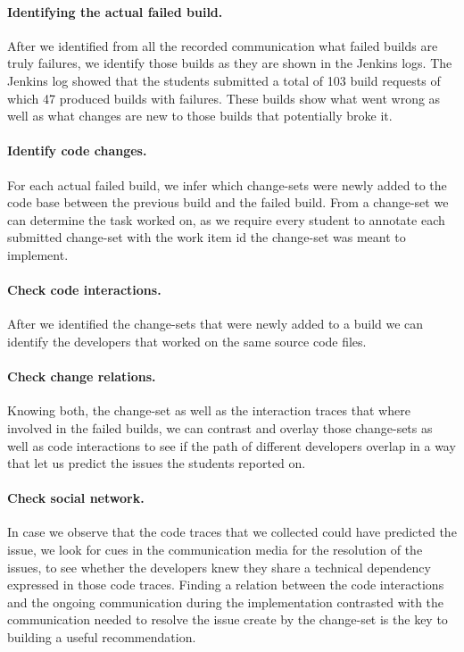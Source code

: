 \paragraph{Identifying the actual failed build.}
After we identified from all the recorded communication what failed builds are truly failures, we identify those builds as they are shown in the Jenkins logs.
The Jenkins log showed that the students submitted a total of 103 build requests of which 47 produced builds with failures. 
These builds show what went wrong as well as what changes are new to those builds that potentially broke it.

\paragraph{Identify code changes.}
For each actual failed build, we infer which change-sets were newly added to the code base between the previous build and the failed build.
From a change-set we can determine the task worked on, as we require every student to annotate each submitted change-set with the work item id the change-set was meant to implement.

\paragraph{Check code interactions.}
After we identified the change-sets that were newly added to a build we can identify the developers that worked on the same source code files.

\paragraph{Check change relations.}
Knowing both, the change-set as well as the interaction traces that where involved in the failed builds, we can contrast and overlay those change-sets as well as code interactions to see if the path of different developers overlap in a way that let us predict the issues the students reported on.

\paragraph{Check social network.}
In case we observe that the code traces that we collected could have predicted the issue, we look for cues in the communication media for the resolution of the issues, to see whether the developers knew they share a technical dependency expressed in those code traces.
Finding a relation between the code interactions and the ongoing communication during the implementation contrasted with the communication needed to resolve the issue create by the change-set is the key to building a useful recommendation.

